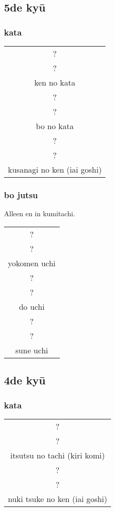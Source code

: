 \documentclass[a4paper, 12pt]{article}
\begin{document}
\subsection{5de ky\={u}}
\subsubsection{kata}
\begin{table}[H]
\begin{center}
\begin{tabular}{c}
?\\
?\\
ken no kata\\
\hline
?\\
?\\
bo no kata\\
\hline
?\\
?\\
kusanagi no ken (iai goshi)
\end{tabular}
\end{center}
\label{kyuu_5_katori_kata}
\end{table}

\subsubsection{bo jutsu}
\noindent Alleen en in kumitachi.
\begin{table}[H]
\begin{center}
\begin{tabular}{c}
?\\
?\\
yokomen uchi\\
\hline
?\\
?\\
do uchi\\
\hline
?\\
?\\
sune uchi
\end{tabular}
\end{center}
\label{kyuu_5_katori_bo}
\end{table}

\subsection{4de ky\={u}}
\subsubsection{kata}
\begin{table}[H]
\begin{center}
\begin{tabular}{c}
?\\
?\\
itsutsu no tachi (kiri komi)\\
\hline
?\\
?\\
nuki tsuke no ken (iai goshi)
\end{tabular}
\end{center}
\label{kyuu_4_katori_kata}
\end{table}
\end{document}
